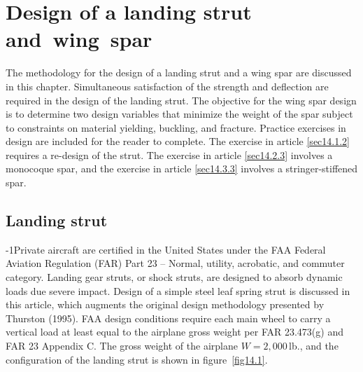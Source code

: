 \documentclass{AeroStructure-ERJohnson}
\begin{document}
\mainmatter

\setcounter{page}{369}

\setcounter{chapter}{13}

\chapter{Design of a landing strut and~wing~spar}

The methodology for the design of a landing strut and a wing spar are discussed in this chapter. Simultaneous satisfaction of the strength and deflection are required in the design of the landing strut. The objective for the wing spar design is to determine two design variables that minimize the weight of the spar subject to constraints on material yielding, buckling, and fracture. Practice exercises in design are included for the reader to complete. The exercise in article \ref{sec14.1.2} requires a re-design of the strut. The exercise in article \ref{sec14.2.3} involves a monocoque spar, and the exercise in article \ref{sec14.3.3} involves a stringer-stiffened spar.

\section{Landing strut}\label{sec14.1}
\looseness-1Private aircraft are certified in the United States under the FAA Federal Aviation Regulation (FAR) Part 23 – Normal, utility, acrobatic, and commuter category. Landing gear struts, or shock struts, are designed to absorb dynamic loads due severe impact. Design of a simple steel leaf spring strut is discussed in this article, which augments the original design methodology presented by Thurston (1995). FAA design conditions require each main wheel to carry a vertical load at least equal to the airplane gross weight per FAR 23.473(g) and FAR 23 Appendix C. The gross weight of the airplane $W=2{,}000$\,lb., and the configuration of the landing strut is shown in figure~\ref{fig14.1}.
\end{document}
